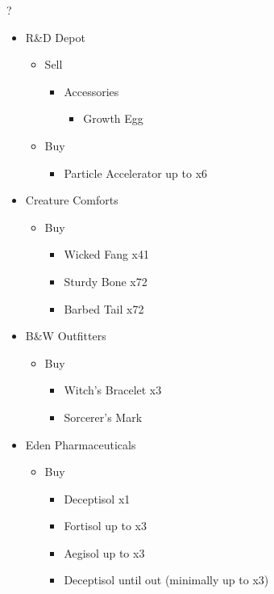 \begin{shop}{?}
	\begin{itemize}
		\item R\&D Depot
			\begin{itemize}
				\item Sell
					\begin{itemize}
						\item Accessories
							\begin{itemize}
								\item Growth Egg
							\end{itemize}
					\end{itemize}
				\item Buy
					\begin{itemize}
						\item Particle Accelerator up to x6
					\end{itemize}
			\end{itemize}
		\item Creature Comforts
			\begin{itemize}
				\item Buy
					\begin{itemize}
						\item Wicked Fang x41
						\item Sturdy Bone x72
						\item Barbed Tail x72
					\end{itemize}
			\end{itemize}
		\item B\&W Outfitters
			\begin{itemize}
				\item Buy
					\begin{itemize}
						\item Witch's Bracelet x3
						\item Sorcerer's Mark
					\end{itemize}
			\end{itemize}
		\item Eden Pharmaceuticals
			\begin{itemize}
				\item Buy
					\begin{itemize}
						\item Deceptisol x1
						\item Fortisol up to x3
						\item Aegisol up to x3
						\item Deceptisol until out (minimally up to x3)
					\end{itemize}
			\end{itemize}						
	\end{itemize}
\end{shop}

